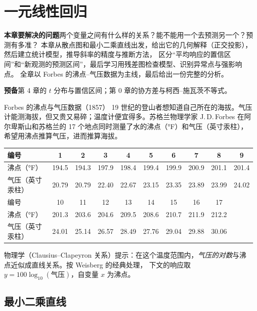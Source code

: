 \chapter{一元线性回归}
\label{ch:regression}

\begin{chapguide}
\textbf{\heiti 本章要解决的问题}\quad 两个变量之间有什么样的关系？能不能用一个去预测另一个？预测有多准？
本章从散点图和最小二乘直线出发，给出它的几何解释（正交投影），然后建立统计模型，推导斜率的精度与推断方法，
区分“平均响应的置信区间”和“新观测的预测区间”，最后学习用残差图检查模型、识别异常点与强影响点。
全章以 Forbes 的沸点–气压数据为主线，最后给出一份完整的分析。\par\smallskip
\textbf{\heiti 预备}\quad 第 4 章的 $t$ 分布与置信区间；第 0 章的协方差与柯西–施瓦茨不等式。
\end{chapguide}

\begin{casestudy}{Forbes 的沸点与气压数据（1857）}
19 世纪的登山者想知道自己所在的海拔。气压计能测海拔，但又贵又易碎；温度计便宜得多。苏格兰物理学家 J.\,D.\,Forbes 在阿尔卑斯山和苏格兰的
17 个地点同时测量了水的沸点（°F）和气压（英寸汞柱），希望用沸点推算气压，进而推算海拔。
\begin{center}\small
\begin{tabular}{l*{9}{c}}
\toprule
编号 & 1 & 2 & 3 & 4 & 5 & 6 & 7 & 8 & 9\\
\midrule
沸点（°F） & 194.5 & 194.3 & 197.9 & 198.4 & 199.4 & 199.9 & 200.9 & 201.1 & 201.4\\
气压（英寸汞柱） & 20.79 & 20.79 & 22.40 & 22.67 & 23.15 & 23.35 & 23.89 & 23.99 & 24.02\\
\midrule[\heavyrulewidth]
编号 & 10 & 11 & 12 & 13 & 14 & 15 & 16 & 17\\
\midrule
沸点（°F） & 201.3 & 203.6 & 204.6 & 209.5 & 208.6 & 210.7 & 211.9 & 212.2\\
气压（英寸汞柱） & 24.01 & 25.14 & 26.57 & 28.49 & 27.76 & 29.04 & 29.88 & 30.06\\
\bottomrule
\end{tabular}
\end{center}
物理学（Clausius–Clapeyron 关系）提示：在这个温度范围内，\emph{气压的对数}与沸点近似成直线关系。按 Weisberg 的经典处理，
下文的响应取 $y=100\log_{10}(\text{气压})$，自变量 $x$ 为沸点。
\end{casestudy}

\section{最小二乘直线}


